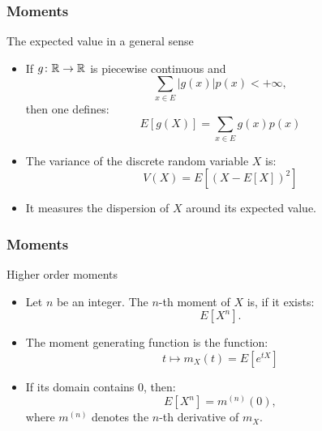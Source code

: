 \begin{frame}
    \frametitle{Moments}
\begin{block}{The expected value in a general sense}
    \begin{itemize} 
        \item<+-> If $g \colon \mathbb{R} \to \mathbb{R}$ is piecewise continuous and
        \begin{equation}
            \sum_{x \in E} \lvert g(x) \rvert p(x) < +\infty,
        \end{equation}
        then one defines:
        \begin{equation}
            E\left[ g(X) \right] = \sum_{x \in E}  g(x) p(x)
        \end{equation}
    \item<+-> The variance of the discrete random variable $X$ is:
    \begin{equation}
        V(X) = E \left[ \left( X - E\left[ X \right] \right)^2 \right]
    \end{equation}
    \item<+-> It measures the dispersion of $X$ around its expected value.
    \end{itemize}
\end{block}
\end{frame}
\begin{frame}
    \frametitle{Moments}
\begin{block}{Higher order moments}
    \begin{itemize} 
        \item<+-> Let $n$ be an integer. The $n$-th moment of $X$ is, if it
        exists:
        \begin{equation}
            E\left[ X^n \right].
        \end{equation}
        \item<+-> The moment generating function is the function:
        \begin{equation}
            t \mapsto m_X(t) = E\left[ e^{tX} \right]
        \end{equation}
    \item <+-> If its domain contains $0$, then:
    \begin{equation}
        E\left[ X^n \right] = m^{(n)}(0),
    \end{equation}
    where $m^{(n)}$ denotes the $n$-th derivative of $m_X$.
\end{itemize}
\end{block}
\end{frame}
